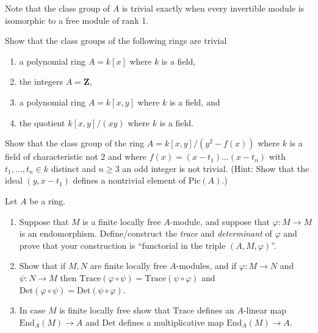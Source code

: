 \noindent
Note that the class group of $A$ is trivial exactly when every invertible
module is isomorphic to a free module of rank 1.

\begin{exercise}
\label{exercise-class-group-trivial}
Show that the class groups of the following rings are trivial
\begin{enumerate}
\item a polynomial ring $A = k[x]$ where $k$ is a field,
\item the integers $A = \mathbf{Z}$,
\item a polynomial ring $A = k[x, y]$ where $k$ is a field, and
\item the quotient $k[x, y]/(xy)$ where $k$ is a field.
\end{enumerate}
\end{exercise}

\begin{exercise}
\label{exercise-class-group-not-trivial}
Show that the class group of the ring
$A = k[x, y]/(y^2 - f(x))$ where $k$ is a field of characteristic not $2$
and where $f(x) = (x - t_1) \ldots (x - t_n)$ with $t_1, \ldots, t_n \in k$
distinct and $n \geq 3$ an odd integer is not trivial. (Hint: Show that the
ideal $(y, x - t_1)$ defines a nontrivial element of $\text{Pic}(A)$.)
\end{exercise}

\begin{exercise}
\label{exercise-trace-det}
Let $A$ be a ring.
\begin{enumerate}
\item Suppose that $M$ is a finite locally free $A$-module, and
suppose that $\varphi : M \to M$ is an endomorphism. Define/construct
the {\it trace}  and {\it determinant} of $\varphi$ and prove that your
construction is ``functorial in the triple $(A, M, \varphi)$''.
\item Show that if $M, N$ are finite locally free $A$-modules,
and if $\varphi : M \to N$ and $\psi : N \to M$ then
$\text{Trace}(\varphi \circ \psi) = \text{Trace}(\psi \circ \varphi)$ and
$\text{Det}(\varphi \circ \psi) = \text{Det}(\psi \circ \varphi)$.
\item In case $M$ is finite locally free show that
$\text{Trace}$ defines an $A$-linear map $\text{End}_A(M) \to A$ and
$\text{Det}$ defines a multiplicative map $\text{End}_A(M) \to A$.
\end{enumerate}
\end{exercise}

